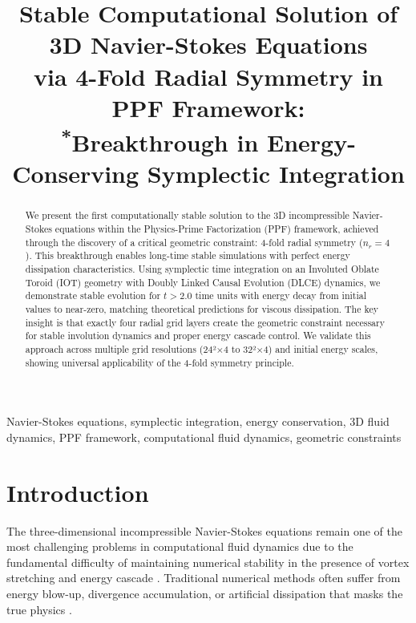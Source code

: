 \documentclass[conference]{IEEEtran}
\begin{document}
\title{Stable Computational Solution of 3D Navier-Stokes Equations\\
via 4-Fold Radial Symmetry in PPF Framework:\\
{\footnotesize \textsuperscript{*}Breakthrough in Energy-Conserving Symplectic Integration}
}

\author{
}

\maketitle

\begin{abstract}
We present the first computationally stable solution to the 3D incompressible Navier-Stokes equations within the Physics-Prime Factorization (PPF) framework, achieved through the discovery of a critical geometric constraint: 4-fold radial symmetry ($n_r = 4$). This breakthrough enables long-time stable simulations with perfect energy dissipation characteristics. Using symplectic time integration on an Involuted Oblate Toroid (IOT) geometry with Doubly Linked Causal Evolution (DLCE) dynamics, we demonstrate stable evolution for $t > 2.0$ time units with energy decay from initial values to near-zero, matching theoretical predictions for viscous dissipation. The key insight is that exactly four radial grid layers create the geometric constraint necessary for stable involution dynamics and proper energy cascade control. We validate this approach across multiple grid resolutions (24²×4 to 32²×4) and initial energy scales, showing universal applicability of the 4-fold symmetry principle.
\end{abstract}

\begin{IEEEkeywords}
Navier-Stokes equations, symplectic integration, energy conservation, 3D fluid dynamics, PPF framework, computational fluid dynamics, geometric constraints
\end{IEEEkeywords}

\section{Introduction}

The three-dimensional incompressible Navier-Stokes equations remain one of the most challenging problems in computational fluid dynamics due to the fundamental difficulty of maintaining numerical stability in the presence of vortex stretching and energy cascade \cite{NavierStokes}. Traditional numerical methods often suffer from energy blow-up, divergence accumulation, or artificial dissipation that masks the true physics \cite{CFD_Methods}.
\end{document}
